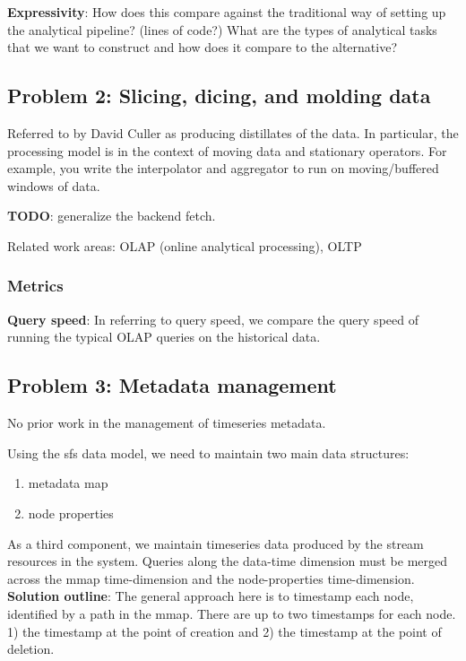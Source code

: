{\bf Expressivity}:  How does this compare against the traditional way of setting up the analytical pipeline?  (lines of code?)
What are the types of analytical tasks that we want to construct and how does it compare to the alternative?


\subsection{Problem 2: Slicing, dicing, and molding data}
Referred to by David Culler as producing distillates of the data.  In particular, the processing model is in the context of moving
data and stationary operators.  For example, you write the interpolator and aggregator to run on moving/buffered windows of data.

{\bf TODO}: generalize the backend fetch.

Related work areas:  OLAP (online analytical processing), OLTP	

\subsubsection{Metrics}
{\bf Query speed}: In referring to query speed, we compare the query speed of running the typical OLAP queries on the historical
data.

\subsection{Problem 3: Metadata management}
No prior work in the management of timeseries metadata.

Using the sfs data model, we need to maintain two main data structures:
\begin{enumerate}
\item metadata map
\item node properties
\end{enumerate}

As a third component, we maintain timeseries data produced by the stream resources in the system.  Queries along the data-time dimension
must be merged across the mmap time-dimension and the node-properties time-dimension.\\

{\bf Solution outline}: The general approach here is to timestamp each node, identified by a path in the mmap.  There are up to two timestamps
for each node.  1)  the timestamp at the point of creation and 2) the timestamp at the point of deletion.\\

